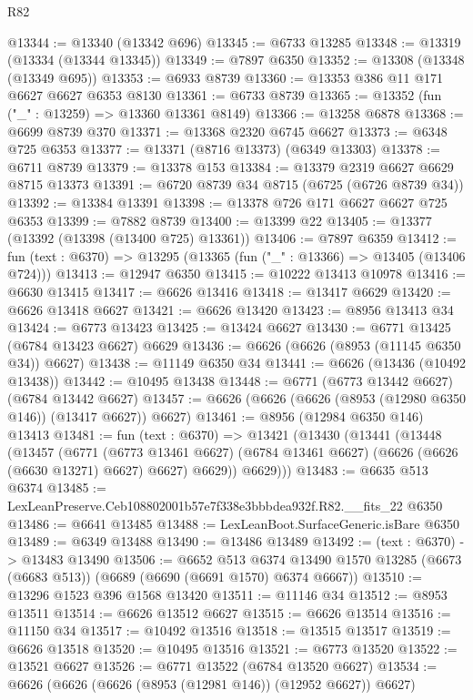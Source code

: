 \begin{lexlean}{R82}
\begin{coremodule}
@13344 := @13340 (@13342 @696)
@13345 := @6733 @13285
@13348 := @13319 (@13334 (@13344 @13345))
@13349 := @7897 @6350
@13352 := @13308 (@13348 (@13349 @695))
@13353 := @6933 @8739
@13360 := @13353 @386 @11 @171 @6627 @6627 @6353 @8130
@13361 := @6733 @8739
@13365 := @13352 (fun ("_" : @13259) => @13360 @13361 @8149)
@13366 := @13258 @6878
@13368 := @6699 @8739 @370
@13371 := @13368 @2320 @6745 @6627
@13373 := @6348 @725 @6353
@13377 := @13371 (@8716 @13373) (@6349 @13303)
@13378 := @6711 @8739
@13379 := @13378 @153
@13384 := @13379 @2319 @6627 @6629 @8715 @13373
@13391 := @6720 @8739 @34 @8715 (@6725 (@6726 @8739 @34))
@13392 := @13384 @13391
@13398 := @13378 @726 @171 @6627 @6627 @725 @6353
@13399 := @7882 @8739
@13400 := @13399 @22
@13405 := @13377 (@13392 (@13398 (@13400 @725) @13361))
@13406 := @7897 @6359
@13412 := fun (text : @6370) => @13295 (@13365 (fun ("_" : @13366) => @13405 (@13406 @724)))
@13413 := @12947 @6350
@13415 := @10222 @13413 @10978
@13416 := @6630 @13415
@13417 := @6626 @13416
@13418 := @13417 @6629
@13420 := @6626 @13418 @6627
@13421 := @6626 @13420
@13423 := @8956 @13413 @34
@13424 := @6773 @13423
@13425 := @13424 @6627
@13430 := @6771 @13425 (@6784 @13423 @6627) @6629
@13436 := @6626 (@6626 (@8953 (@11145 @6350 @34)) @6627)
@13438 := @11149 @6350 @34
@13441 := @6626 (@13436 (@10492 @13438))
@13442 := @10495 @13438
@13448 := @6771 (@6773 @13442 @6627) (@6784 @13442 @6627)
@13457 := @6626 (@6626 (@6626 (@8953 (@12980 @6350 @146)) (@13417 @6627)) @6627)
@13461 := @8956 (@12984 @6350 @146) @13413
@13481 := fun (text : @6370) =>
  @13421
    (@13430
      (@13441
        (@13448
          (@13457
            (@6771
              (@6773 @13461 @6627)
              (@6784 @13461 @6627)
              (@6626 (@6626 (@6630 @13271) @6627) @6627)
              @6629))
          @6629)))
@13483 := @6635 @513 @6374
@13485 := LexLeanPreserve.Ceb108802001b57e7f338e3bbbdea932f.R82.__fits_22 @6350
@13486 := @6641 @13485
@13488 := LexLeanBoot.SurfaceGeneric.isBare @6350
@13489 := @6349 @13488
@13490 := @13486 @13489
@13492 := (text : @6370) -> @13483 @13490
@13506 := @6652
    @513
    @6374
    @13490
    @1570
    @13285
    (@6673 (@6683 @513))
    (@6689 (@6690 (@6691 @1570) @6374 @6667))
@13510 := @13296 @1523 @396 @1568 @13420
@13511 := @11146 @34
@13512 := @8953 @13511
@13514 := @6626 @13512 @6627
@13515 := @6626 @13514
@13516 := @11150 @34
@13517 := @10492 @13516
@13518 := @13515 @13517
@13519 := @6626 @13518
@13520 := @10495 @13516
@13521 := @6773 @13520
@13522 := @13521 @6627
@13526 := @6771 @13522 (@6784 @13520 @6627)
@13534 := @6626 (@6626 (@6626 (@8953 (@12981 @146)) (@12952 @6627)) @6627)

\end{coremodule}
\end{lexlean}
